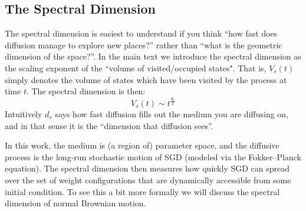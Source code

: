 \documentclass{article} %
\theoremstyle{definition}
\begin{document}
\subsection{The Spectral Dimension}\label{app:spectral_dim}
The spectral dimension is easiest to understand if you think “how fast does diffusion manage to explore new places?” rather than “what is the geometric dimension of the space?”. In the main text we introduce the spectral dimension as the scaling exponent of the ``volume of visited/occupied states". That is, $V_s(t)$ simply denotes the volume of states which have been visited by the process at time $t$. The spectral dimension is then:
\begin{equation}
    V_s(t) \sim t^{\frac{d_s}{2}}
\end{equation}
Intuitively $d_s$ says how fast diffusion fills out the medium you are diffusing on, and in that sense it is the “dimension that diffusion sees”.

In this work, the medium is (a region of) parameter space, and the diffusive process is the long-run stochastic motion of SGD (modeled via the Fokker–Planck equation). The spectral dimension then measures how quickly SGD can spread over the set of weight configurations that are dynamically accessible from some initial condition. To see this a bit more formally we will discuss the spectral dimension of normal Brownian motion.
\end{document}
